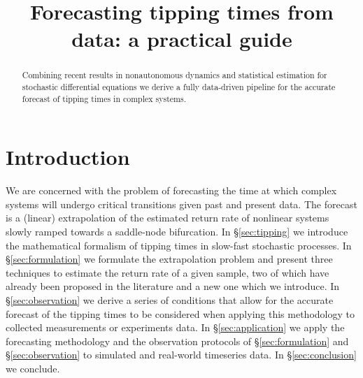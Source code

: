 \documentclass[11pt,a4paper]{article}
\title{Forecasting tipping times from data: a practical guide}
\author{}
\date{}
\theoremstyle{plain}
\theoremstyle{definition}
\theoremstyle{remark}
\begin{document}
\maketitle
\vspace{-1.1cm}

\begin{abstract}\noindent
        Combining recent results in nonautonomous dynamics and statistical estimation for stochastic differential equations we derive a fully data-driven pipeline for the accurate forecast of tipping times in complex systems.
\end{abstract}

\section{Introduction}\label{sec:intro}
We are concerned with the problem of forecasting the time at which complex systems will undergo critical transitions given past and present data.
The forecast is a (linear) extrapolation of the estimated return rate of nonlinear systems slowly ramped towards a saddle-node bifurcation.
In \S\ref{sec:tipping} we introduce the mathematical formalism of tipping times in slow-fast stochastic processes.
In \S\ref{sec:formulation} we formulate the extrapolation problem and present three techniques to estimate the return rate of a given sample, two of which have already been proposed in the literature and a new one which we introduce.
In \S\ref{sec:observation} we derive a series of conditions that allow for the accurate forecast of the tipping times to be considered when applying this methodology to collected measurements or experiments data.
In \S\ref{sec:application} we apply the forecasting methodology and the observation protocols of \S\ref{sec:formulation} and \S\ref{sec:observation} to simulated and real-world timeseries data.
In \S\ref{sec:conclusion} we conclude.
\end{document}
